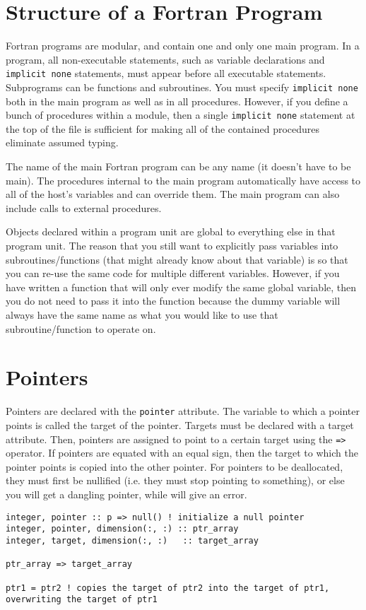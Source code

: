 \documentclass[10pt]{article}
\begin{document}
\section{Structure of a Fortran Program}
Fortran programs are modular, and contain one and only one main program. In a program, all non-executable statements, such as variable declarations and {\tt implicit none} statements, must appear before all executable statements. Subprograms can be functions and subroutines. You must specify {\tt implicit none} both in the main program as well as in all procedures. However, if you define a bunch of procedures within a module, then a single {\tt implicit none} statement at the top of the file is sufficient for making all of the contained procedures eliminate assumed typing.

The name of the main Fortran program can be any name (it doesn't have to be main). The procedures internal to the main program automatically have access to all of the host's variables and can override them. The main program can also include calls to external procedures.

Objects declared within a program unit are global to everything else in that program unit. The reason that you still want to explicitly pass variables into subroutines/functions (that might already know about that variable) is so that you can re-use the same code for multiple different variables. However, if you have written a function that will only ever modify the same global variable, then you do not need to pass it into the function because the dummy variable will always have the same name as what you would like to use that subroutine/function to operate on. 

\section{Pointers}
Pointers are declared with the {\tt pointer} attribute. The variable to which a pointer points is called the target of the pointer. Targets must be declared with a target attribute. Then, pointers are assigned to point to a certain target using the {\tt =>} operator. If pointers are equated with an equal sign, then the target to which the pointer points is copied into the other pointer. For pointers to be deallocated, they must first be nullified (i.e. they must stop pointing to something), or else you will get a dangling pointer, while will give an error.

\begin{lstlisting}
integer, pointer :: p => null() ! initialize a null pointer
integer, pointer, dimension(:, :) :: ptr_array
integer, target, dimension(:, :)   :: target_array

ptr_array => target_array

ptr1 = ptr2 ! copies the target of ptr2 into the target of ptr1, overwriting the target of ptr1
\end{lstlisting}
\end{document}
